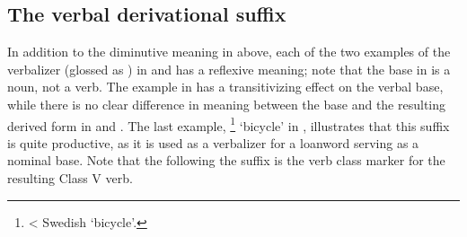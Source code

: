 \subsection{The verbal derivational suffix }\label{vblzD}
In addition to the diminutive meaning in  above, 
each of the two examples of the verbalizer  (glossed as ) in  and  has a reflexive meaning; note that the base in  is a noun, not a verb. The example in  has a transitivizing effect on the verbal base, while there is no clear difference in meaning between the base and the resulting derived form in  and . The last example, \footnote{< Swedish  ‘bicycle’.} 
‘bicycle’ in , illustrates that this suffix is quite productive, as it is used as a verbalizer for a loanword serving as a nominal base. 
Note that the  following the  suffix is the verb class marker for the resulting Class V verb. 
\ea\label{vblzDex1}
\z
\ea\label{vblzDex2}
\z
\ea\label{vblzDex4}
\z
\ea\label{vblzDex5}
\z
\ea\label{vblzDex5b}
\z
\ea\label{vblzDex6}
\z



